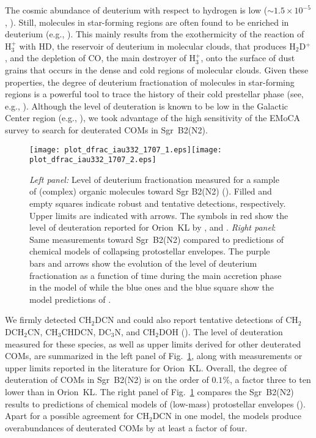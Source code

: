 \documentclass{iau}
\begin{document}
The cosmic abundance of deuterium with respect to hydrogen is low 
($\sim$$1.5\times10^{-5}$, \cite{Linsky03}). Still, molecules in star-forming
regions are often found to be enriched in deuterium (e.g., \cite{Parise06}).
This mainly results from the exothermicity of the reaction of H$_3^+$  with
HD, the reservoir of deuterium in molecular clouds, that produces H$_2$D$^+$, 
and the depletion of CO, the main destroyer of H$_3^+$, onto the surface of 
dust grains that occurs in the dense and cold regions of molecular clouds.
Given these properties, the degree of deuterium fractionation of molecules in 
star-forming regions is a powerful tool to trace the history of their cold 
prestellar phase (see, e.g., \cite{Caselli12,Ceccarelli14}). 
Although the level of deuteration is known to be low in the Galactic Center 
region (e.g., \cite{Gerin92}), we took advantage of the high
sensitivity of the EMoCA survey to search for deuterated COMs in Sgr~B2(N2).

\begin{figure}
\begin{center}
\texttt{[image: plot\_dfrac\_iau332\_1707\_1.eps]}\hspace*{0.02\hsize}\texttt{[image: plot\_dfrac\_iau332\_1707\_2.eps]}
\end{center}
\caption{\textit{Left panel:} Level of deuterium fractionation measured for a
sample of (complex) organic molecules toward Sgr B2(N2) (\cite{Belloche16}). 
Filled and empty squares indicate robust and tentative detections, 
respectively. Upper limits are indicated with arrows. The symbols in red show 
the level of deuteration reported for Orion~KL by 
\cite{Gerin92,Margules09,Daly13,Esplugues13,Neill13}, and \cite{Coudert13}.
\textit{Right panel}: Same measurements toward Sgr~B2(N2) compared to 
predictions of chemical models of collapsing protostellar envelopes. The purple
bars and arrows show the evolution of the level of deuterium fractionation as
a function of time during the main accretion phase in the model of 
\cite{Taquet14} while the blue ones and the blue square show the model 
predictions of \cite{Aikawa12}.}
\label{f:dfrac}
\end{figure}

We firmly detected CH$_2$DCN and could also report tentative detections of 
CH$_2$DCH$_2$CN, CH$_3$CHDCN, DC$_3$N, and CH$_2$DOH (\cite{Belloche16}). The
level of deuteration measured for these species, as well as upper limits
derived for other deuterated COMs, are summarized in the left panel of 
Fig.~\ref{f:dfrac}, along with measurements or upper limits reported in the
literature for Orion~KL. Overall, the degree of deuteration of COMs in 
Sgr~B2(N2) is on the order of $0.1\%$, a factor three to ten lower than in 
Orion~KL. The right panel of Fig.~\ref{f:dfrac} compares the Sgr~B2(N2) 
results to predictions of chemical models of (low-mass) protostellar envelopes 
(\cite{Aikawa12,Taquet14}). Apart for a possible agreement for CH$_2$DCN in
one model, the models produce overabundances of deuterated COMs by at least a 
factor of four.
\end{document}
